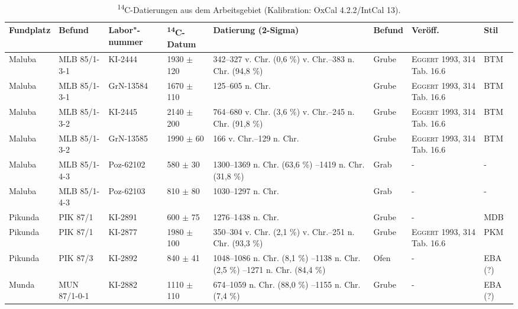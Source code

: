 {\footnotesize
{\renewcommand{\arraystretch}{1.5}%
\begin{longtable}{@{}p{1.3cm}p{1.5cm}p{1.3cm}p{1cm}p{3.75cm}p{1cm}p{2cm}p{}@{}}
\toprule
\textbf{Fundplatz} & \textbf{Befund} & \textbf{Labor"-nummer} & \textbf{\textsuperscript{14}C-Datum} & \textbf{Datierung (2-Sigma)} & \textbf{Befund} & \textbf{Veröff.} & \textbf{Stil} \\ 
\midrule 
\endhead
\bottomrule
\caption{\textsuperscript{14}C-Datierungen aus dem Arbeitsgebiet (Kalibration: OxCal 4.2.2/IntCal 13).}
\label{tab:14Cdatings}
\endfoot
Maluba & MLB 85/1-3-1 & KI-2444 & 1930 \( \pm \) 120 & 342–327 v. Chr. (0,6 \%) \newline 204 v. Chr.–383 n. Chr. (94,8 \%) & Grube & \textsc{Eggert} 1993, 314 Tab. 16.6 & BTM \\ 
Maluba & MLB 85/1-3-1 & GrN-13584 & 1670 \( \pm \) 110 & 125–605 n. Chr. & Grube & \textsc{Eggert} 1993, 314 Tab. 16.6 & BTM \\ 
Maluba & MLB 85/1-3-2 & KI-2445 & 2140 \( \pm \) 200 & 764–680 v. Chr. (3,6 \%) \newline 674 v. Chr.–245 n. Chr. (91,8 \%) & Grube & \textsc{Eggert} 1993, 314 Tab. 16.6 & BTM \\ 
Maluba & MLB 85/1-3-2 & GrN-13585 & 1990 \( \pm \) 60 & 166 v. Chr.–129 n. Chr. & Grube & \textsc{Eggert} 1993, 314 Tab. 16.6 & BTM \\ 
Maluba & MLB 85/1-4-3 & Poz-62102 & 580 \( \pm \) 30 & 1300–1369 n. Chr. (63,6 \%) \newline 1381–1419 n. Chr. (31,8 \%) & Grab & - & - \\ 
Maluba & MLB 85/1-4-3 & Poz-62103 & 810 \( \pm \) 80 & 1030–1297 n. Chr. & Grab & - & - \\ 
Pikunda & PIK 87/1 & KI-2891 & 600 \( \pm \) 75 & 1276–1438 n. Chr. & Grube & - & MDB  \\ 
Pikunda & PIK 87/1 & KI-2877 & 1980 \( \pm \) 100 & 350–304 v. Chr. (2,1 \%) \newline 210 v. Chr.–251 n. Chr. (93,3 \%) & Grube & \textsc{Eggert} 1993, 314 Tab. 16.6 & PKM \\ 
Pikunda & PIK 87/3 & KI-2892 & 840 \( \pm \) 41 & 1048–1086 n. Chr. (8,1 \%) \newline 1123–1138 n. Chr. (2,5 \%) \newline 1150–1271 n. Chr. (84,4 \%) & Ofen & - & EBA (?) \\ 
Munda & MUN 87/1-0-1 & KI-2882 & 1110 \( \pm \) 110 & 674–1059 n. Chr. (88,0 \%) \newline 1075–1155 n. Chr. (7,4 \%) & Grube & - & EBA (?) \\ 

\end{longtable}}}
